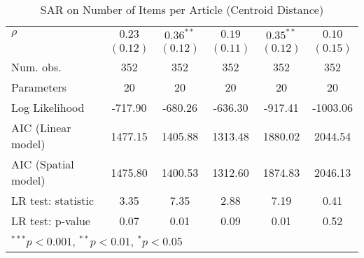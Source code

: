 \begin{table}[!h]
\begin{center}
\begin{tabular}{l c c c c c }
$\rho$                  & $0.23$       & $0.36^{**}$   & $0.19$       & $0.35^{**}$  & $0.10$       \\
                        & $(0.12)$     & $(0.12)$      & $(0.11)$     & $(0.12)$     & $(0.15)$     \\
\midrule
Num. obs.               & 352          & 352           & 352          & 352          & 352          \\
Parameters              & 20           & 20            & 20           & 20           & 20           \\
Log Likelihood          & -717.90      & -680.26       & -636.30      & -917.41      & -1003.06     \\
AIC (Linear model)      & 1477.15      & 1405.88       & 1313.48      & 1880.02      & 2044.54      \\
AIC (Spatial model)     & 1475.80      & 1400.53       & 1312.60      & 1874.83      & 2046.13      \\
LR test: statistic      & 3.35         & 7.35          & 2.88         & 7.19         & 0.41         \\
LR test: p-value        & 0.07         & 0.01          & 0.09         & 0.01         & 0.52         \\
\bottomrule
\multicolumn{6}{l}{\scriptsize{$^{***}p<0.001$, $^{**}p<0.01$, $^*p<0.05$}}
\end{tabular}
\caption{SAR on Number of Items per Article (Centroid Distance)}
\label{table:coefficients}
\end{center}
\end{table}
